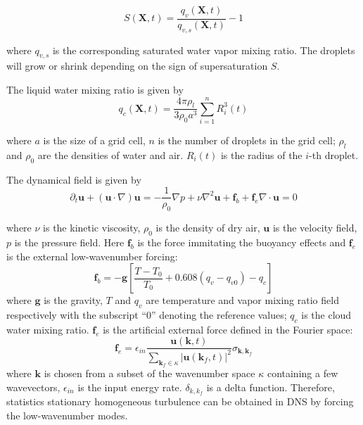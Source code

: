\documentclass[draft,jgrga]{AGUTeX}
\begin{document}
\begin{article}
\begin{subequations}
\begin{equation}
S(\mathbf{X},t)=\frac{q_{v}(\mathbf{X},t)}{q_{v,s}(\mathbf{X},t)}-1\label{eq:Supersat}
\end{equation}

\end{subequations}

where $q_{v,s}$ is the corresponding saturated water vapor mixing ratio. The droplets
will grow or shrink depending on the sign of supersaturation $S$.

The liquid water mixing ratio is given by
\begin{equation}
q_{c}(\mathbf{X},t)=\frac{4\pi\rho_{l}}{3\rho_{0}a^{3}}\sum_{i=1}^{n}R_{i}^{3}(t)\label{eq:cloud_water}
\end{equation}


where $a$ is the size of a grid cell, $n$ is the number of droplets
in the grid cell; $\rho_{l}$ and $\rho_{0}$ are the densities of water 
and air. $R_{i}(t)$ is the radius of the $i$-th droplet.

The dynamical field is given by
\begin{subequations}

\begin{equation}
\partial_{t}\mathbf{u}+(\mathbf{u}\cdot\nabla)\mathbf{u}=-\frac{1}{\rho_{0}}\nabla p+\nu\nabla^2 \mathbf{u}+\mathbf{f}_b + \mathbf{f}_e\label{eq:NS1}
\end{equation}


\begin{equation}
\nabla\cdot \mathbf{u}=0\label{eq:NS2}
\end{equation}

\end{subequations}

where $\nu$ is the kinetic viscosity, $\rho_{0}$ is the density of
dry air, $\mathbf{u}$ is the velocity field, $p$ is the pressure field. Here $\mathbf{f}_b$ is the force immitating the buoyancy effects and $\mathbf{f}_e$ is the external low-wavenumber forcing:
\begin{equation}
\mathbf{f}_b= 
-\mathbf{g}[\frac{T-T_{0}}{T_0}+0.608(q_{v}-q_{v0})-q_{c}]
\label{eq:source_term}
\end{equation}
where $\mathbf{g}$ is the gravity, $T$ and $q_{v}$ are temperature
and vapor mixing ratio field respectively with the subscript ``$0$''
denoting the reference values; $q_{c}$ is the cloud water mixing
ratio. $\mathbf{f}_e$ is the artificial external force defined in the Fourier space:
\begin{equation}
\mathbf{f}_e = \epsilon_{in}\frac{\mathbf{u}(\mathbf{k},t)}
{\sum_{\mathbf{k}_f\in \kappa}|\mathbf{u}(\mathbf{k}_f,t)|^2}
\sigma_{\mathbf{k},\mathbf{k}_f}
\end{equation}
where $\mathbf{k}$ is chosen from a subset of the wavenumber space $\kappa$ containing a few wavevectors, $\epsilon_{in}$ is the input energy rate. $\delta_{k,k_f}$ is a delta function. Therefore, statistics stationary homogeneous turbulence 
can be obtained in DNS by forcing the low-wavenumber modes.


\end{article}
\end{document}
